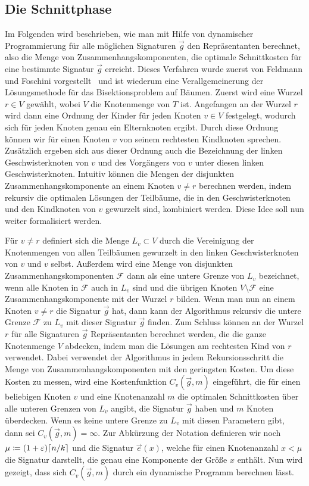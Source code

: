 \subsection{Die Schnittphase}\label{sec:cutting}
Im Folgenden wird beschrieben, wie man mit Hilfe von dynamischer Programmierung für alle möglichen Signaturen $\vec{g}$ den Repräsentanten berechnet, also die Menge von Zusammenhangskomponenten, die optimale Schnittkosten für eine bestimmte Signatur $\vec{g}$ erreicht.
Dieses Verfahren wurde zuerst von Feldmann und Foschini vorgestellt~\parencite{FF15} und ist wiederum eine Verallgemeinerung der Lösungsmethode für das Bisektionsproblem auf Bäumen. \parencite{mcg78, ws11}
Zuerst wird eine Wurzel $r \in V$ gewählt, wobei $V$ die Knotenmenge von $T$ ist. 
Angefangen an der Wurzel $r$ wird dann eine Ordnung der Kinder für jeden Knoten $v \in V$ festgelegt, wodurch sich für jeden Knoten genau ein Elternknoten ergibt.
Durch diese Ordnung können wir für einen Knoten $v$ von seinem rechtesten Kindknoten sprechen. 
Zusätzlich ergeben sich aus dieser Ordnung auch die Bezeichnung der linken Geschwisterknoten von $v$ und des Vorgängers von $v$ unter diesen linken Geschwisterknoten.
Intuitiv können die Mengen der disjunkten Zusammenhangskomponente an einem Knoten $v \neq r$ berechnen werden, indem rekursiv die optimalen Lösungen der Teilbäume, die in den Geschwisterknoten und den Kindknoten von $v$ gewurzelt sind, kombiniert werden.
Diese Idee soll nun weiter formalisiert werden.

Für $v \neq r$ definiert sich die Menge $L_v \subset V$ durch die Vereinigung der Knotenmengen von allen Teilbäumen gewurzelt in den linken Geschwisterknoten von $v$ und $v$ selbst.
Außerdem wird eine Menge von disjunkten Zusammenhangskomponenten $\mathcal{F}$ dann als eine untere Grenze von $L_v$ bezeichnet, wenn alle Knoten in $\mathcal{F}$ auch in $L_v$ sind und die übrigen Knoten $V \setminus \mathcal{F}$ eine Zusammenhangskomponente mit der Wurzel $r$ bilden.
Wenn man nun an einem Knoten $v \neq r$ die Signatur $\vec{g}$ hat, dann kann der Algorithmus rekursiv die untere Grenze $\mathcal{F}$ zu $L_v$ mit dieser Signatur $\vec{g}$ finden.
Zum Schluss können an der Wurzel $r$ für alle Signaturen $\vec{g}$ Repräsentanten berechnet werden, die die ganze Knotenmenge $V$ abdecken, indem man die Lösungen am rechtesten Kind von $r$ verwendet.
Dabei verwendet der Algorithmus in jedem Rekursionsschritt die Menge von Zusammenhangskomponenten mit den geringsten Kosten. 
Um diese Kosten zu messen, wird eine Kostenfunktion $C_v(\vec{g}, m)$ eingeführt, die für einen beliebigen Knoten $v$ und eine Knotenanzahl $m$ die optimalen Schnittkosten über alle unteren Grenzen von $L_v$ angibt, die Signatur $\vec{g}$ haben und $m$ Knoten überdecken.
Wenn es keine untere Grenze zu $L_v$ mit diesen Parametern gibt, dann sei $C_v(\vec{g}, m) = \infty$.
Zur Abkürzung der Notation definieren wir noch $\mu \coloneqq (1+\eps)\ceil*{n/k}$ und die Signatur $\vec{e}(x)$, welche für einen Knotenanzahl $x < \mu$ die Signatur darstellt, die genau eine Komponente der Größe $x$ enthält.
Nun wird gezeigt, dass sich $C_v(\vec{g}, m)$ durch ein dynamische Programm berechnen lässt.

